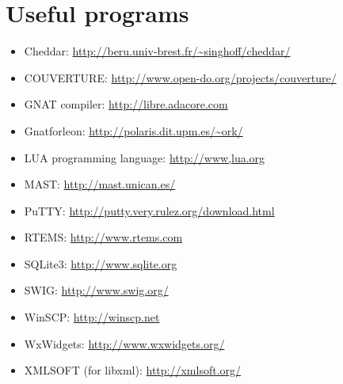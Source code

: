 \documentclass[11pt]{book}
\newcommand{\Concept}[1]{#1\xspace}
\newcommand{\rtems}{\Concept{RTEMS}}
\begin{document}
{\chapter{Useful programs}
\label{subsection-useful-programs}
\begin{itemize}
   \item
      Cheddar: \url{http://beru.univ-brest.fr/~singhoff/cheddar/}
   \item
      COUVERTURE: \url{http://www.open-do.org/projects/couverture/}
   \item
      GNAT compiler: \url{http://libre.adacore.com}
   \item
      Gnatforleon: \url{http://polaris.dit.upm.es/~ork/}
   \item
      LUA programming language: \url{http://www,lua.org}
   \item
      MAST: \url{http://mast.unican.es/}
   \item
      PuTTY: \url{http://putty.very.rulez.org/download.html}
   \item
      \rtems: \url{http://www.rtems.com}
   \item
      SQLite3: \url{http://www.sqlite.org}
   \item
      SWIG: \url{http://www.swig.org/}
   \item
      WinSCP: \url{http://winscp.net}
   \item
      WxWidgets: \url{http://www.wxwidgets.org/}
   \item
      XMLSOFT (for libxml): \url{http://xmlsoft.org/}
\end{itemize}

}
\end{document}
